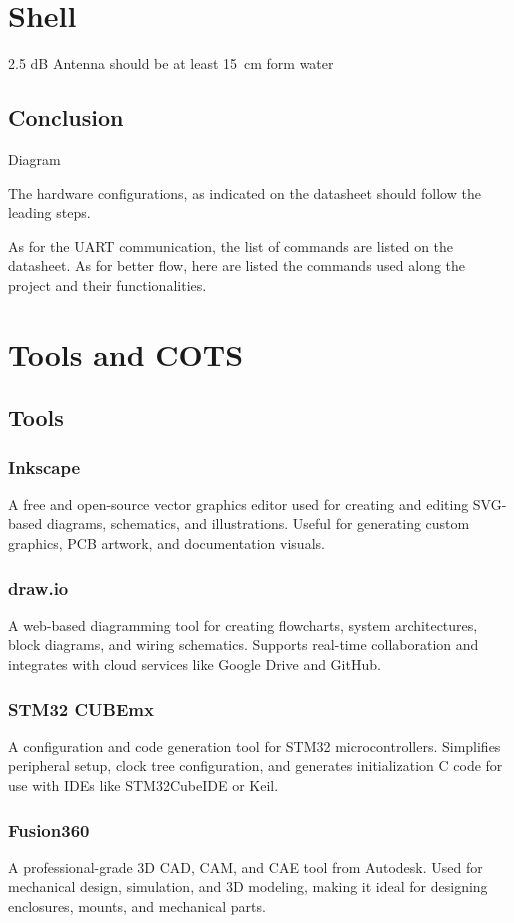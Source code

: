\section{Shell}
2.5 dB Antenna should be at least 15 cm form water 


\subsection{Conclusion}

Diagram


The hardware configurations, as indicated on the datasheet should follow the leading steps.

As for the UART communication, the list of commands are listed on the datasheet. 
As for better flow, here are listed the commands used along the project and their functionalities. 


\section{Tools and COTS}
\subsection{Tools}
\subsubsection{Inkscape}
A free and open-source vector graphics editor used for creating and editing SVG-based diagrams, schematics, and illustrations. Useful for generating custom graphics, PCB artwork, and documentation visuals.
\subsubsection{draw.io}
A web-based diagramming tool for creating flowcharts, system architectures, block diagrams, and wiring schematics. Supports real-time collaboration and integrates with cloud services like Google Drive and GitHub.
\subsubsection{STM32 CUBEmx}
A configuration and code generation tool for STM32 microcontrollers. Simplifies peripheral setup, clock tree configuration, and generates initialization C code for use with IDEs like STM32CubeIDE or Keil.
\subsubsection{Fusion360}
A professional-grade 3D CAD, CAM, and CAE tool from Autodesk. Used for mechanical design, simulation, and 3D modeling, making it ideal for designing enclosures, mounts, and mechanical parts.
